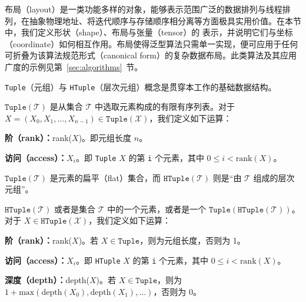 

\CuTe 布局（layout）是一类功能多样的对象，能够表示范围广泛的数据排列与线程排列，在抽象物理地址、将迭代顺序与存储顺序相分离等方面极具实用价值。在本节中，我们定义形状（shape）、布局与张量（tensor）的 \CuTe 表示，并说明它们与坐标（coordinate）如何相互作用。\CuTe 布局使得泛型算法只需单一实现，便可应用于任何可折叠为该算法规范形式（canonical form）的复杂数据布局。此类算法及其应用广度的示例见第~\ref{sec:algorithms}~节。


{\tt Tuple}（元组）与 {\tt HTuple}（层次元组）概念是贯穿本工作的基础数据结构。

\begin{definition}
$\texttt{Tuple}(\mathcal{T})$ 是从集合 $\mathcal{T}$ 中选取元素构成的有限有序列表。对于 $X = (X_0,X_1,\ldots,X_{n-1}) \in \texttt{Tuple}(\mathcal{X})$，我们定义如下运算：
\begin{compactitem}
\item {\bf 阶（rank）：}rank($X$)。即元组长度 $n$。
\item {\bf 访问（access）：}$X_i$。即 \texttt{Tuple} $X$ 的第 \texttt{i} 个元素，其中 $0 \leq i < \text{rank}(X)$。
\end{compactitem}
\end{definition}

\noindent $\texttt{Tuple}(\mathcal{T})$ 是元素的扁平（flat）集合，而 $\texttt{HTuple}(\mathcal{T})$ 则是“由 $\mathcal{T}$ 组成的层次元组”。

\begin{definition}
$\texttt{HTuple}(\mathcal{T})$ 或者是集合 $\mathcal{T}$ 中的一个元素，或者是一个 $\texttt{Tuple}(\texttt{HTuple}(\mathcal{T}))$。对于 $X \in \texttt{HTuple}(\mathcal{X})$，我们定义如下运算：
\begin{compactitem}
\item {\bf 阶（rank）：}rank($X$)。若 $X \in \texttt{Tuple}$，则为元组长度，否则为 1。
\item {\bf 访问（access）：}$X_i$。即 \texttt{HTuple} $X$ 的第 \texttt{i} 个元素，其中 $0 \leq i < \text{rank}(X)$。
\item {\bf 深度（depth）：}depth($X$)。若 $X \in \texttt{Tuple}$，则为 $1 + \text{max}(\text{depth}(X_0), \text{depth}(X_1), \ldots)$，否则为 0。
\end{compactitem}
\end{definition}

